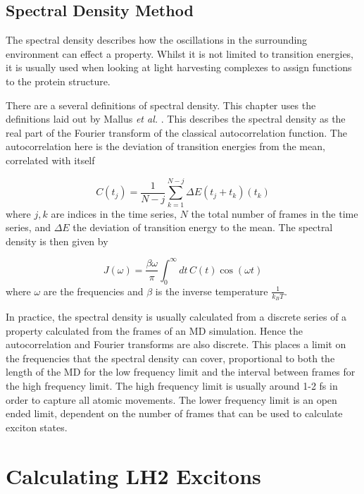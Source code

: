 \subsection{Spectral Density Method}
\label{subsec:spec_dens}

The spectral density describes how the oscillations in the surrounding environment 
can effect a property. Whilst it is not limited to transition energies, it is usually
used when looking at light harvesting complexes to assign functions to the protein
structure. 

There are a several definitions of spectral density. This chapter uses the definitions
laid out by Mallus \emph{et al.} \cite{Mallus2018}. This describes the spectral density
as the real part of the Fourier transform of the classical autocorrelation function.
The autocorrelation here is the deviation of transition energies from the mean, 
correlated with itself

\begin{equation}
    C\left(t_j\right) = \frac{1}{N-j} \sum^{N-j}_{k=1} \Delta E \left(t_j + t_k\right) \left(t_k\right)
\end{equation}
%
where $j,k$ are indices in the time series, $N$ the total number of frames in the
time series, and $\Delta E$ the deviation of transition energy to the mean. The
spectral density is then given by

\begin{equation}
    J\left(\omega\right) = \frac{\beta \omega}{\pi} \int^\infty_0 dt \, C\left(t\right) \cos \left(\omega t\right)
\end{equation}
%
where $\omega$ are the frequencies and $\beta$ is the inverse temperature $\frac{1}{k_B T}$.

In practice, the spectral density is usually calculated from a discrete series of 
a property calculated from the frames of an MD simulation. Hence the autocorrelation
and Fourier transforms are also discrete. This places a limit on the frequencies 
that the spectral density can cover, proportional to both the length of the MD
for the low frequency limit and the interval between frames for the high frequency
limit. The high frequency limit is usually around 1-2 fs in order to capture all
atomic movements. The lower frequency limit is an open ended limit, dependent on
the number of frames that can be used to calculate exciton states.

\section{Calculating LH2 Excitons}
\label{sec:MD}

